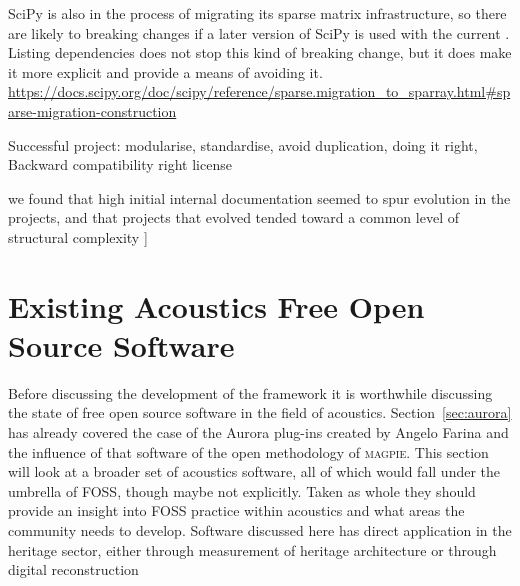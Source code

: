 SciPy is also in the process of migrating its sparse matrix infrastructure, so there are likely to breaking changes if a later version of SciPy is used with the current . Listing dependencies does not stop this kind of breaking change, but it does make it more explicit and provide a means of avoiding it. \url{https://docs.scipy.org/doc/scipy/reference/sparse.migration_to_sparray.html#sparse-migration-construction}

Successful project: modularise, standardise, avoid duplication, doing it right, Backward compatibility right license \cite{bangerth_makes_2013}

we found that high initial internal documentation seemed to spur evolution in the projects, and that projects that evolved tended toward a common level of structural complexity \cite{darcy_exploring_2010}]

\section{Existing Acoustics Free Open Source Software}

Before discussing the development of the  framework it is worthwhile discussing the state of free open source software in the field of acoustics.
Section~\ref{sec:aurora} has already covered the case of the Aurora plug-ins created by Angelo Farina and the influence of that software of the open methodology of \textsc{magpie}.
This section will look at a broader set of acoustics software, all of which would fall under the umbrella of FOSS, though maybe not explicitly.
Taken as whole they should provide an insight into FOSS practice within acoustics and what areas the community needs to develop.
Software discussed here has direct application in the heritage sector, either through measurement of heritage architecture \cite{tronchin_acoustics_1997,fagerlande_adequaccao_2020} or through digital reconstruction \cite{katz_exploring_2020}

